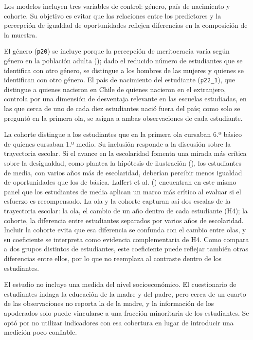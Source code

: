 \documentclass[
  spanish,
  a4paper,
  oneside]{scrbook}
\begin{document}
Los modelos incluyen tres variables de control: género, país de
nacimiento y cohorte. Su objetivo es evitar que las relaciones entre los
predictores y la percepción de igualdad de oportunidades reflejen
diferencias en la composición de la muestra.

El género (\texttt{p20}) se incluye porque la percepción de meritocracia
varía según género en la población adulta
();
dado el reducido número de estudiantes que se identifica con otro
género, se distingue a los hombres de las mujeres y quienes se
identifican con otro género. El país de nacimiento del estudiante
(\texttt{p22\_1}), que distingue a quienes nacieron en Chile de quienes
nacieron en el extranjero, controla por una dimensión de desventaja
relevante en las escuelas estudiadas, en las que cerca de uno de cada
diez estudiantes nació fuera del país; como solo se preguntó en la
primera ola, se asigna a ambas observaciones de cada estudiante.

La cohorte distingue a los estudiantes que en la primera ola cursaban
6.º básico de quienes cursaban 1.º medio. Su inclusión responde a la
discusión sobre la trayectoria escolar. Si el avance en la escolaridad
fomenta una mirada más crítica sobre la desigualdad, como plantea la
hipótesis de ilustración (), los estudiantes de media, con varios años más de
escolaridad, deberían percibir menos igualdad de oportunidades que los
de básica. Laffert et al. ()
encuentran en este mismo panel que los estudiantes de media aplican un
marco más crítico al evaluar si el esfuerzo es recompensado. La ola y la
cohorte capturan así dos escalas de la trayectoria escolar: la ola, el
cambio de un año dentro de cada estudiante (H4); la cohorte, la
diferencia entre estudiantes separados por varios años de escolaridad.
Incluir la cohorte evita que esa diferencia se confunda con el cambio
entre olas, y su coeficiente se interpreta como evidencia complementaria
de H4. Como compara a dos grupos distintos de estudiantes, este
coeficiente puede reflejar también otras diferencias entre ellos, por lo
que no reemplaza al contraste dentro de los estudiantes.

El estudio no incluye una medida del nivel socioeconómico. El
cuestionario de estudiantes indaga la educación de la madre y del padre,
pero cerca de un cuarto de las observaciones no reporta la de la madre,
y la información de los apoderados solo puede vincularse a una fracción
minoritaria de los estudiantes. Se optó por no utilizar indicadores con
esa cobertura en lugar de introducir una medición poco confiable.
\end{document}
